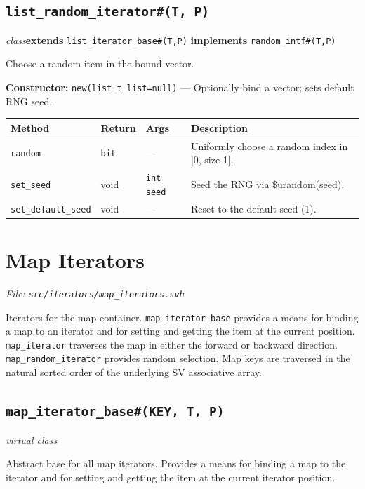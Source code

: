 \documentclass[11pt,letterpaper]{report}
\begin{document}
\subsection*{\texttt{list\_random\_iterator\#(T, P)}}
\noindent\small\textit{class}\quad \textbf{extends} \texttt{list\_iterator\_base\#(T,P)} \quad \textbf{implements} \texttt{random\_intf\#(T,P)}\par

Choose a random item in the bound vector.

\noindent\textbf{Constructor:} \texttt{new(list\_t list=null)} --- Optionally bind a vector; sets default RNG seed.

\begin{xltabular}{\linewidth}{>{\small}p{1.35in} >{\small}p{1.25in} >{\small}p{0.95in} >{\small}X}
\toprule
\textbf{Method} & \textbf{Return} & \textbf{Args} & \textbf{Description} \\
\midrule
\endhead
\bottomrule
\endfoot
\texttt{random} & \texttt{bit} & --- & Uniformly choose a random index in [0, size-1]. \\
\texttt{set\_seed} & void & \texttt{int seed} & Seed the RNG via \$urandom(seed). \\
\texttt{set\_default\_seed} & void & --- & Reset to the default seed (1). \\
\end{xltabular}

\section{Map Iterators}
\noindent\small\textit{File: \texttt{src/iterators/map\_iterators.svh}}\par

Iterators for the map container. \texttt{map\_iterator\_base} provides a means for binding a map to an iterator and for setting and getting the item at the current position. \texttt{map\_iterator} traverses the map in either the forward or backward direction. \texttt{map\_random\_iterator} provides random selection. Map keys are traversed in the natural sorted order of the underlying SV associative array.

\subsection*{\texttt{map\_iterator\_base\#(KEY, T, P)}}
\noindent\small\textit{virtual class}\par

Abstract base for all map iterators. Provides a means for binding a map to the iterator and for setting and getting the item at the current iterator position.
\end{document}
